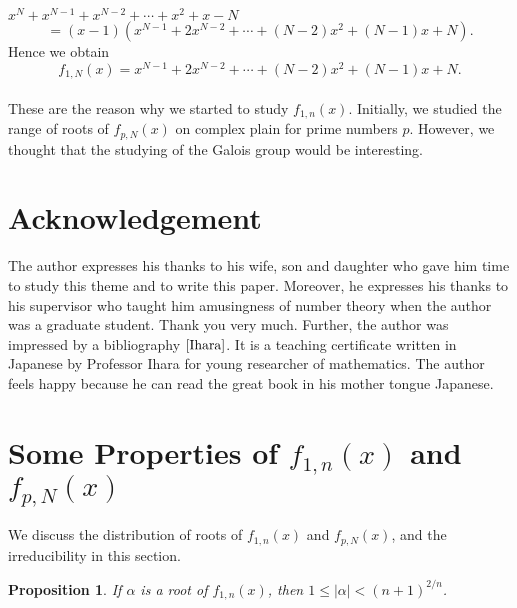 \documentclass{article}
\newtheorem{prop}{Proposition}[section]
\begin{document}
$x^{N}+x^{N-1}+x^{N-2}+\cdots +x^{2}+x-N$
\begin{equation}
=(x-1)(x^{N-1}+2x^{N-2}+\cdots +(N-2)x^{2}+(N-1)x+N).
\end{equation}
Hence we obtain
\begin{equation}
f_{1,N}(x)=x^{N-1}+2x^{N-2}+\cdots +(N-2)x^{2}+(N-1)x+N.
\end{equation}\\
These are the reason why we started to study $f_{1,n}(x)$. Initially, we studied the range of roots of $f_{p,N}(x)$ on complex plain for prime numbers $p$. However, we thought that the studying of the Galois group would be interesting. 

\section*{Acknowledgement}
The author expresses his thanks to his wife, son and daughter who gave him time to study this theme and to write this paper. Moreover, he expresses his thanks to his supervisor who taught him amusingness of number theory when  the author was a graduate student. Thank you very much.
Further, the author was impressed by a bibliography $\cite{Ihara}$. It is a teaching certificate written in Japanese by Professor Ihara for young researcher of mathematics. The author feels happy because he can read the great book in his mother tongue Japanese.


\section{Some Properties of $f_{1,n}(x)$ and $f_{p,N}(x)$}
We discuss the distribution of roots of $f_{1,n}(x)$ and $f_{p,N}(x)$, and the irreducibility in this section.

\begin{prop}
\upshape
If $\alpha$ is a root of $f_{1,n}(x)$, then $1\leq |\alpha|<(n+1)^{2/n}$.
\end{prop}
\end{document}
